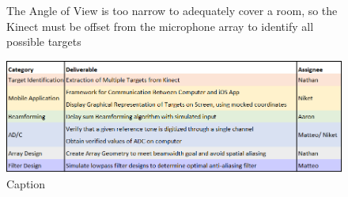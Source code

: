 \documentclass[10pt,journal,compsoc]{IEEEtran}
\begin{document}
\begin{figure}[t]
\centering
{}
\hfil
{}

\caption{The Angle of View is too narrow to adequately cover a room, so the Kinect must be offset from the microphone array to identify all possible targets}
\label{fig:kinect_straight}
\end{figure}

\begin{figure}[t]
    \centering
    \includegraphics[width=6in]{mdr_deliverables}
    \caption{Caption}
    \label{fig:mdr_deliberables}
\end{figure}
\end{document}
